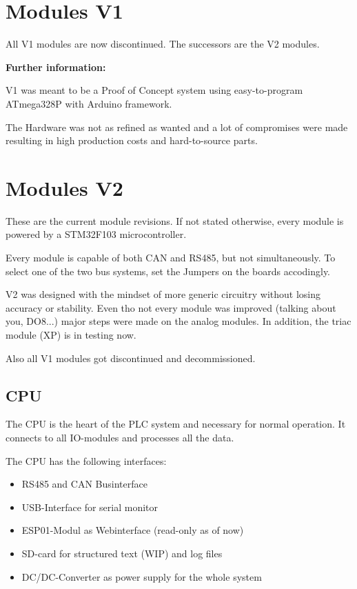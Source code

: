 \chapter{Modules V1}
All V1 modules are now discontinued. The successors are the V2 modules.

\vspace{2cm}

\textbf{Further information:}

V1 was meant to be a Proof of Concept system using easy-to-program ATmega328P with Arduino framework. 

The Hardware was not as refined as wanted and a lot of compromises were made resulting in high production costs and hard-to-source parts. 

\chapter{Modules V2}
These are the current module revisions. If not stated otherwise, every module is powered by a STM32F103 microcontroller. 

Every module is capable of both CAN and RS485, but not simultaneously. To select one of the two bus systems, set the Jumpers on the boards accodingly.

\vspace{1cm}

V2 was designed with the mindset of more generic circuitry without losing accuracy or stability. Even tho not every module was improved (talking about you, DO8...) major steps were made on the analog modules. In addition, the triac module (XP) is in testing now.

Also all V1 modules got discontinued and decommissioned.\pagebreak

\section{CPU}
The CPU is the heart of the PLC system and necessary for normal operation. It connects to all IO-modules and processes all the data.

The CPU has the following interfaces:

\begin{itemize}
    \item RS485 and CAN Businterface
    \item USB-Interface for serial monitor
    \item ESP01-Modul as Webinterface (read-only as of now)
    \item SD-card for structured text (WIP) and log files
    \item DC/DC-Converter as power supply for the whole system
\end{itemize}


